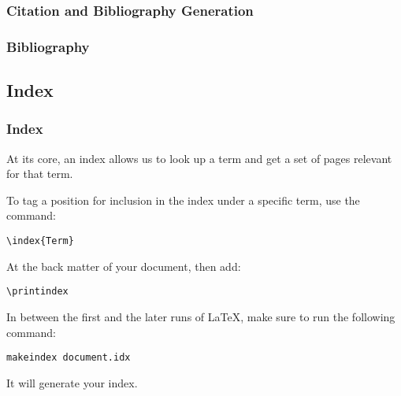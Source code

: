 {\begin{frame}[fragile]
\end{frame}

\subsubsection{Citation and Bibliography Generation}
\begin{frame}[fragile]
  \frametitle{Bibliography }
  \vspace{3mm}
  
\end{frame}


\subsection{Index}
\begin{frame}[fragile]
  \frametitle{Index}
  \vspace{3mm}
  At its core, an index allows us to look up a term and get a set of pages relevant for that term.
  
  \vspace{4mm}
  To tag a position for inclusion in the index under a specific term, use the command:
  \begin{verbatim}
\index{Term}
  \end{verbatim}
  
  \vspace{4mm}
  At the back matter of your document, then add:
  \begin{verbatim}
\printindex
  \end{verbatim}
  
  \vspace{4mm}
  In between the first and the later runs of \LaTeX, make sure to run the following command:
  \begin{verbatim}
makeindex document.idx
  \end{verbatim}
  
  \vspace{4mm}
  It will generate your index.
\end{frame}

}


